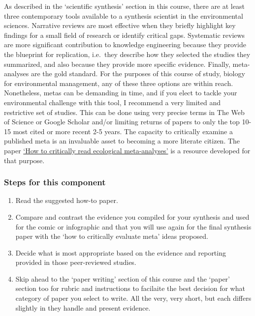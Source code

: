 \documentclass[
]{book}
\providecommand{\tightlist}{%
  \setlength{\itemsep}{0pt}\setlength{\parskip}{0pt}}
\begin{document}
As described in the `scientific synthesis' section in this course, there are at least three contemporary tools available to a synthesis scientist in the environmental sciences. Narrative reviews are most effective when they briefly highlight key findings for a small field of research or identify critical gaps. Systematic reviews are more significant contribution to knowledge engineering because they provide the blueprint for replication, i.e.~they describe how they selected the studies they summarized, and also because they provide more specific evidence. Finally, meta-analyses are the gold standard. For the purposes of this course of study, biology for environmental management, any of these three options are within reach. Nonetheless, metas can be demanding in time, and if you elect to tackle your environmental challenge with this tool, I recommend a very limited and restrictive set of studies. This can be done using very precise terms in The Web of Science or Google Scholar and/or limiting returns of papers to only the top 10-15 most cited or more recent 2-5 years. The capacity to critically examine a published meta is an invaluable asset to becoming a more literate citizen. The paper \href{How\%20to\%20critically\%20read\%20ecological\%20meta-analyses}{`How to critically read ecological meta-analyses'}\citep{RN3498} is a resource developed for that purpose.

\hypertarget{steps-for-this-component}{%
\subsubsection*{Steps for this component}\label{steps-for-this-component}}

\begin{enumerate}
\def\labelenumi{\arabic{enumi}.}
\tightlist
\item
  Read the suggested how-to paper.\\
\item
  Compare and contrast the evidence you compiled for your synthesis and used for the comic or infographic and that you will use again for the final synthesis paper with the `how to critically evaluate meta' ideas proposed.\\
\item
  Decide what is most appropriate based on the evidence and reporting provided in those peer-reviewed studies.\\
\item
  Skip ahead to the `paper writing' section of this course and the `paper' section too for rubric and instructions to facilaite the best decision for what category of paper you select to write. All the very, very short, but each differs slightly in they handle and present evidence.
\end{enumerate}
\end{document}
